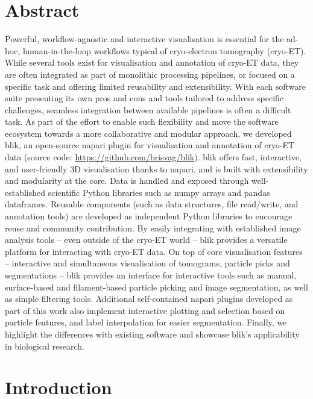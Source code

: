 \section{Abstract}
Powerful, workflow-agnostic and interactive visualisation is essential for the ad-hoc, human-in-the-loop workflows typical of cryo-electron tomography (cryo-ET). While several tools exist for visualisation and annotation of cryo-ET data, they are often integrated as part of monolithic processing pipelines, or focused on a specific task and offering limited reusability and extensibility. With each software suite presenting its own pros and cons and tools tailored to address specific challenges, seamless integration between available pipelines is often a difficult task.
As part of the effort to enable such flexibility and move the software ecosystem towards a more collaborative and modular approach, we developed blik, an open-source napari plugin for visualisation and annotation of cryo-ET data (source code: \url{https://github.com/brisvag/blik}).
blik offers fast, interactive, and user-friendly 3D visualisation thanks to napari, and is built with extensibility and modularity at the core. Data is handled and exposed through well-established scientific Python libraries such as numpy arrays and pandas dataframes. Reusable components (such as data structures, file read/write, and annotation tools) are developed as independent Python libraries to encourage reuse and community contribution. By easily integrating with established image analysis tools -- even outside of the cryo-ET world -- blik provides a versatile platform for interacting with cryo-ET data.
On top of core visualisation features -- interactive and simultaneous visualisation of tomograms, particle picks and segmentations -- blik provides an interface for interactive tools such as manual, surface-based and filament-based particle picking and image segmentation, as well as simple filtering tools. Additional self-contained napari plugins developed as part of this work also implement interactive plotting and selection based on particle features, and label interpolation for easier segmentation.
Finally, we highlight the differences with existing software and showcase blik's applicability in biological research.

\section{Introduction}

